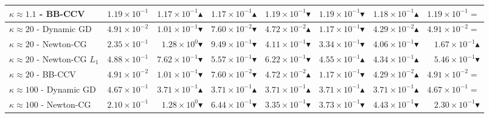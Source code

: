 \begin{table}[H]
\begin{tabular}{@{}lrrrrrrr@{}}
$\kappa\approx1.1$ - BB-CCV & $1.19\times10^{-1}$ & $1.17\times10^{-1}$$\blacktriangle$ & $1.17\times10^{-1}$$\blacktriangle$ & $1.19\times10^{-1}$$\blacktriangledown$ & $1.19\times10^{-1}$$\blacktriangledown$ & $1.18\times10^{-1}$$\blacktriangle$ & $1.19\times10^{-1}$$=$\\

\midrule

$\kappa\approx20$ - Dynamic GD & $4.91\times10^{-2}$ & $1.01\times10^{-1}$$\blacktriangledown$ & $7.60\times10^{-2}$$\blacktriangledown$ & $4.72\times10^{-2}$$\blacktriangle$ & $1.17\times10^{-1}$$\blacktriangledown$ & $4.29\times10^{-2}$$\blacktriangle$ & $4.91\times10^{-2}$$=$\\

$\kappa\approx20$ - Newton-CG & $2.35\times10^{-1}$ & $1.28\times10^{0}$$\blacktriangledown$ & $9.49\times10^{-1}$$\blacktriangledown$ & $4.11\times10^{-1}$$\blacktriangledown$ & $3.34\times10^{-1}$$\blacktriangledown$ & $4.06\times10^{-1}$$\blacktriangledown$ & $1.67\times10^{-1}$$\blacktriangle$\\

$\kappa\approx20$ - Newton-CG $L_1$ & $4.88\times10^{-1}$ & $7.62\times10^{-1}$$\blacktriangledown$ & $5.57\times10^{-1}$$\blacktriangledown$ & $6.22\times10^{-1}$$\blacktriangledown$ & $4.55\times10^{-1}$$\blacktriangle$ & $4.34\times10^{-1}$$\blacktriangle$ & $5.46\times10^{-1}$$\blacktriangledown$\\

$\kappa\approx20$ - BB-CCV & $4.91\times10^{-2}$ & $1.01\times10^{-1}$$\blacktriangledown$ & $7.60\times10^{-2}$$\blacktriangledown$ & $4.72\times10^{-2}$$\blacktriangle$ & $1.17\times10^{-1}$$\blacktriangledown$ & $4.29\times10^{-2}$$\blacktriangle$ & $4.91\times10^{-2}$$=$\\

\midrule

$\kappa\approx100$ - Dynamic GD & $4.67\times10^{-1}$ & $3.71\times10^{-1}$$\blacktriangle$ & $3.71\times10^{-1}$$\blacktriangle$ & $3.71\times10^{-1}$$\blacktriangle$ & $3.71\times10^{-1}$$\blacktriangle$ & $3.71\times10^{-1}$$\blacktriangle$ & $4.67\times10^{-1}$$=$\\

$\kappa\approx100$ - Newton-CG & $2.10\times10^{-1}$ & $1.28\times10^{0}$$\blacktriangledown$ & $6.44\times10^{-1}$$\blacktriangledown$ & $3.35\times10^{-1}$$\blacktriangledown$ & $3.73\times10^{-1}$$\blacktriangledown$ & $4.43\times10^{-1}$$\blacktriangledown$ & $2.30\times10^{-1}$$\blacktriangledown$\\


\end{tabular}
\end{table}
